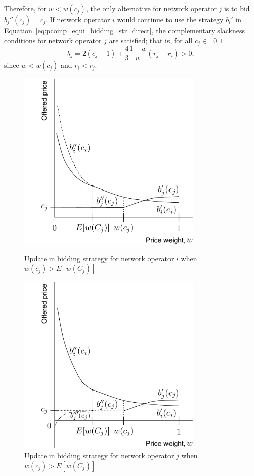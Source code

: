 Therefore, for $w < w(c_j)$, the only alternative for network operator $j$ is to bid $b_j''(c_j)=c_j$. If network operator $i$ would continue to use the strategy $b_i'$ in Equation~\eqref{eq:pcomp_equi_bidding_str_direct}, the complementary slackness conditions for network operator $j$ are satisfied; that is, for all $c_j\in[0,1]$
\begin{equation*}
	\lambda_j = 2(c_j - 1) + \frac{4}{3}\frac{1-w}{w}(r_j-r_i)>0,
\end{equation*}
since $w < w(c_j)$ and $r_i<r_j$.

\begin{figure}[p!]
	\includegraphics[width=3.5in]{Direct/Figures/pincomplete_bids_update_i_1}
	\caption{Update in bidding strategy for network operator $i$ when $w(c_j) > E[w(C_j)]$}
	\label{fig:pincomplete_bids_update_i_1_direct}
	\vspace{10mm}
	\includegraphics[width=3.5in]{Direct/Figures/pincomplete_bids_update_j_1}
	\caption{Update in bidding strategy for network operator $j$ when $w(c_j) > E[w(C_j)]$}
	\label{fig:pincomplete_bids_update_j_1_direct}
\end{figure}

